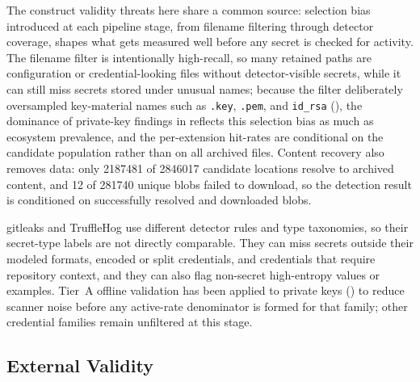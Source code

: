 The construct validity threats here share a common source: selection bias introduced at each pipeline stage, from filename filtering through detector coverage, shapes what gets measured well before any secret is checked for activity.
The filename filter is intentionally high-recall, so many retained paths are configuration or credential-looking files without detector-visible secrets, while it can still miss secrets stored under unusual names; because the filter deliberately oversampled key-material names such as \texttt{.key}, \texttt{.pem}, and \texttt{id\_rsa} (), the dominance of private-key findings in  reflects this selection bias as much as ecosystem prevalence, and the per-extension hit-rates are conditional on the candidate population rather than on all archived files.
Content recovery also removes data: only \num{2187481} of \num{2846017} candidate locations resolve to archived content, and \num{12} of \num{281740} unique blobs failed to download, so the detection result is conditioned on successfully resolved and downloaded blobs.

gitleaks and TruffleHog use different detector rules and type taxonomies, so their secret-type labels are not directly comparable.
They can miss secrets outside their modeled formats, encoded or split credentials, and credentials that require repository context, and they can also flag non-secret high-entropy values or examples.
Tier~A offline validation has been applied to private keys () to reduce scanner noise before any active-rate denominator is formed for that family; other credential families remain unfiltered at this stage.

\subsection{External Validity}
\label{subsec:sec-val-external}

